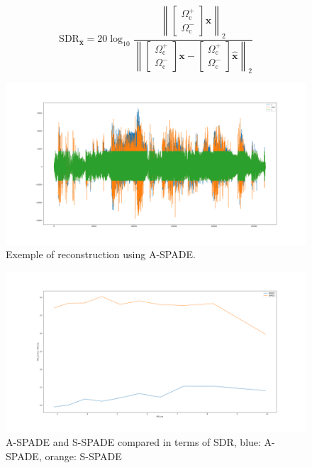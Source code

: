 \documentclass[twocolumn]{scrartcl}
\begin{document}
    \begin{equation}
      \mathrm{SDR}_{\hat{\boldsymbol{x}}}=20 \log _{10} \frac{\left\|\left[
            \begin{array}{c}
              \Omega_{\mathrm{c}}^{+} \\
              \Omega_{\mathrm{c}}^{-}
            \end{array}\right]
          \boldsymbol{x}\right\|_{2}}{\left\|\left[
            \begin{array}{c}
              \Omega_{\mathrm{c}}^{+} \\
              \Omega_{\mathrm{c}}^{-}
            \end{array}\right]
          \boldsymbol{x}-\left[
            \begin{array}{c}
              \Omega_{\mathrm{c}}^{+} \\
              \Omega_{\mathrm{c}}^{-}
            \end{array}\right]
          \hat{\boldsymbol{x}}\right\|_{2}}
    \end{equation}

\begin{figure}
  \centering
 \includegraphics[width=\textwidth]{fig/Figure_2.png}
 \caption{Exemple of reconstruction using A-SPADE.}
 \label{fig:plot}
\end{figure}
\begin{figure}
  \centering
  \includegraphics[width=\textwidth]{fig/Figure_3.png}
  \caption{A-SPADE and S-SPADE compared in terms of SDR, blue: A-SPADE, orange: S-SPADE}
  \label{fig:sdr}
\end{figure}
\end{document}

